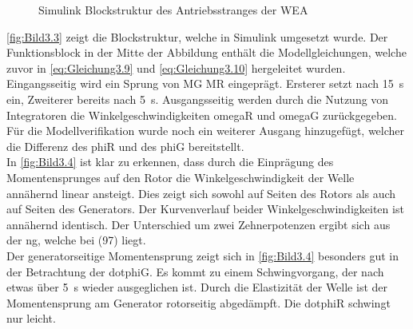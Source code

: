 \begin{figure}[H]
   \centering
   \caption[Antriebsstrang Simulink]{Simulink Blockstruktur des Antriebsstranges der WEA}
   \label{fig:Bild3.3}
\end{figure}

\autoref{fig:Bild3.3} zeigt die Blockstruktur, welche in Simulink umgesetzt wurde. Der Funktionsblock in der Mitte der Abbildung enthält die Modellgleichungen, welche zuvor in \autoref{eq:Gleichung3.9} und \autoref{eq:Gleichung3.10} hergeleitet wurden. Eingangsseitig wird ein Sprung von \acs{MG} \bzw \acs{MR} eingeprägt. Ersterer setzt nach \SI{15}{s} ein, Zweiterer bereits nach \SI{5}{s}. Ausgangsseitig werden durch die Nutzung von Integratoren die Winkelgeschwindigkeiten \acs{omegaR} und \acs{omegaG} zurückgegeben. Für die Modellverifikation wurde noch ein weiterer Ausgang hinzugefügt, welcher die Differenz des \ac{phiR} und des \ac{phiG} bereitstellt. \\

In \autoref{fig:Bild3.4} ist klar zu erkennen, dass durch die Einprägung des Momentensprunges auf den Rotor die Winkelgeschwindigkeit der Welle annähernd linear ansteigt. Dies zeigt sich sowohl auf Seiten des Rotors als auch auf Seiten des Generators. Der Kurvenverlauf beider Winkelgeschwindigkeiten ist annähernd identisch. Der Unterschied um zwei Zehnerpotenzen ergibt sich aus der \acf{ng}, welche bei  (97) liegt.\\
Der generatorseitige Momentensprung zeigt sich in \autoref{fig:Bild3.4} besonders gut in der Betrachtung der \ac{dotphiG}. Es kommt zu einem Schwingvorgang, der nach etwas über \SI{5}{s} wieder ausgeglichen ist. Durch die Elastizität der Welle ist der Momentensprung am Generator rotorseitig abgedämpft. Die \ac{dotphiR} schwingt nur leicht.

